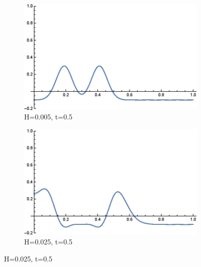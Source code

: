 \documentclass[12pt]{article}
\numberwithin{equation}{section}
\begin{document}
\begin{figure}
    \begin{subfigure}[b]{0.42\textwidth}
        \includegraphics[width=\textwidth]{figures/linear-solution/linear-solution-H_0.005_t_0.5.eps}
        \caption{H=0.005, t=0.5}
    \end{subfigure}
    \hfill
    \begin{subfigure}[b]{0.42\textwidth}
        \includegraphics[width=\textwidth]{figures/linear-solution/linear-solution-H_0.025_t_0.5.eps}
        \caption{H=0.025, t=0.5}
    \end{subfigure}
    

\end{figure}
\end{document}
